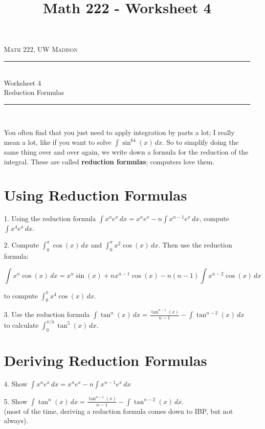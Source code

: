\documentclass[paper=a4, fontsize=11pt]{scrartcl} %
\title{Math 222 - Worksheet 4}
\numberwithin{equation}{section} %
\numberwithin{figure}{section} %
\numberwithin{table}{section} %
\newcommand{\horrule}[1]{\rule{\linewidth}{#1}} %
\begin{document}
{
\normalfont \normalsize 
\begin{flushright}
\textsc{Math 222, UW Madison}
\end{flushright}
{\center
\horrule{0.5pt} \\[0.4cm] %
{\huge Worksheet 4}\\
Reduction Formulas \\ %
\horrule{2pt} \\[0.5cm] %
}}



You often find that you just need to apply integration by parts a lot; I really mean a lot, like if you want to solve $\displaystyle \int \sin^{64}(x)\,dx$.  So to simplify doing the same thing over and over again, we write down a formula for the reduction of the integral.  These are called {\bfseries reduction formulas}; computers love them.

\section*{Using Reduction Formulas}

1. Using the reduction formula $\displaystyle \int x^n e^x\,dx = x^n e^x - n\int x^{n-1}e^x\,dx$, compute $\displaystyle \int x^4 e^x\,dx$.

\vfill

2. Compute $\displaystyle \int_0^{\pi} \cos(x)\,dx$ and $\displaystyle \int_0^{\pi} x^2 \cos(x)\,dx$.  Then use the reduction formula:

\[ \int x^n\cos(x)\,dx = x^n\sin(x) + nx^{n-1}\cos(x) - n(n-1)\int x^{n-2}\cos(x)\,dx \]

to compute $\displaystyle \int_0^{\pi} x^4 \cos(x)\,dx$.

\vfill
\vfill

\newpage

3. Use the reduction formula $\displaystyle \int \tan^n(x)\,dx = \frac{\tan^{n-1}(x)}{n-1} - \int \tan^{n-2}(x)\,dx$ to calculate $\displaystyle \int_0^{\pi/4} \tan^5(x)\,dx$.

\vfill


\section*{Deriving Reduction Formulas}

4. Show $\displaystyle \int x^n e^x\,dx = x^n e^x - n \int x^{n-1} e^x\,dx$\\
\vfill

5. Show $\displaystyle \int \tan^n(x)\,dx = \frac{\tan^{n-1}(x)}{n-1} - \int \tan^{n-2}(x)\,dx$.\\
(most of the time, deriving a reduction formula comes down to IBP, but not always).
\vfill
\end{document}
